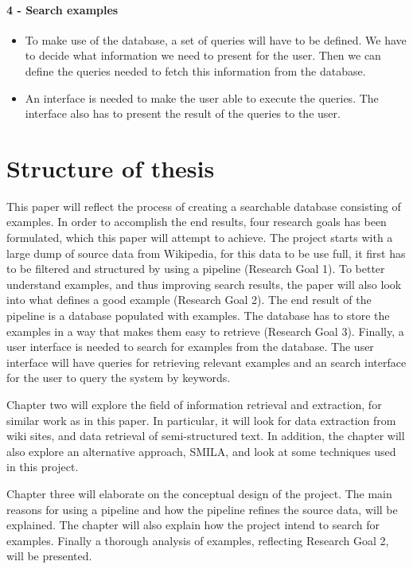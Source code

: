 \paragraph{4 - Search examples} 
\begin{itemize}
    \item To make use of the database, a set of queries will have to be defined. We have to decide what information we need to present for the user. Then we can define the queries needed to fetch this information from the database.
    \item An interface is needed to make the user able to execute the queries. The interface also has to present the result of the queries to the user.
\end{itemize}


\section{Structure of thesis}
This paper will reflect the process of creating a searchable database consisting of examples. In order to accomplish the end results, four research goals has been formulated, which this paper will attempt to achieve. The project starts with a large dump of source data from Wikipedia, for this data to be use full, it first has to be filtered and structured by using a pipeline (Research Goal 1). To better understand examples, and thus improving search results, the paper will also look into what defines a good example (Research Goal 2). The end result of the pipeline is a database populated with examples. The database has to store the examples in a way that makes them easy to retrieve (Research Goal 3). Finally, a user interface is needed to search for examples from the database. The user interface will have queries for retrieving relevant examples and an search interface for the user to query the system by keywords. 

Chapter two will explore the field of information retrieval and extraction, for similar work as in this paper. In particular, it will look for data extraction from wiki sites, and data retrieval of semi-structured text. In addition, the chapter will also explore an alternative approach, SMILA, and look at some techniques used in this project.

Chapter three will elaborate on the conceptual design of the project. The main reasons for using a pipeline and how the pipeline refines the source data, will be explained. The chapter will also explain how the project intend to search for examples. Finally a thorough analysis of examples, reflecting Research Goal 2, will be presented.

